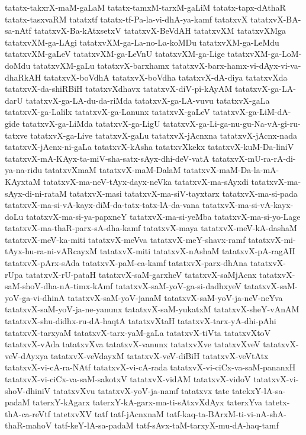 {tatatx-takxrX-maM-gaLaM
tatatx-tamxM-tarxM-gaLiM
tatatx-tapx-dAthaR
tatatx-tasxvaRM
tatatxtf
tatatx-tf-Pa-la-vi-dhA-ya-kamf
tatatxvX
tatatxvX-BA-sa-nAtf
tatatxvX-Ba-kAtxsetxV
tatatxvX-BeVdAH
tatatxvXM
tatatxvXMga
tatatxvXM-ga-LAgi
tatatxvXM-ga-La-no-La-koMDu
tatatxvXM-ga-LeMdu
tatatxvXM-gaLeV
tatatxvXM-ga-LeVnU
tatatxvXM-ga-Lige
tatatxvXM-ga-LoM-doMdu
tatatxvXM-gaLu
tatatxvX-barxhamx
tatatxvX-barx-hamx-vi-dAyx-vi-va-dhaRkAH
tatatxvX-boVdhA
tatatxvX-boVdha
tatatxvX-dA-diya
tatatxvXda
tatatxvX-da-shiRBiH
tatatxvXdhavx
tatatxvX-diV-pi-kAyAM
tatatxvX-ga-LA-darU
tatatxvX-ga-LA-du-da-riMda
tatatxvX-ga-LA-vuvu
tatatxvX-gaLa
tatatxvX-ga-Lalilx
tatatxvX-ga-Lanunx
tatatxvX-gaLeV
tatatxvX-ga-LiM-dA-gide
tatatxvX-ga-LiMda
tatatxvX-ga-LigU
tatatxvX-ga-Li-ga-nu-gu-Na-vA-gi-ru-tatxve
tatatxvX-ga-Live
tatatxvX-gaLu
tatatxvX-jAcnxna
tatatxvX-jAcnx-nada
tatatxvX-jAcnx-ni-gaLa
tatatxvX-kAsha
tatatxvXkekx
tatatxvX-kuM-Da-liniV
tatatxvX-mA-KAyx-ta-miV-sha-satx-sAyx-dhi-deV-vatA
tatatxvX-mU-ra-rA-di-ya-na-ridu
tatatxvXmaM
tatatxvX-maM-DalaM
tatatxvX-maM-Da-la-mA-KAyxtaM
tatatxvX-ma-neV-tAyx-dayx-neVka
tatatxvX-ma-sAyxdi
tatatxvX-ma-sAyx-di-ni-rataM
tatatxvX-masi
tatatxvX-ma-siV-tayxtarx
tatatxvX-ma-si-pada
tatatxvX-ma-si-vA-kayx-diM-da-tatx-tatx-lA-da-vana
tatatxvX-ma-si-vA-kayx-doLu
tatatxvX-ma-si-ya-papxneY
tatatxvX-ma-si-yeMba
tatatxvX-ma-si-yo-Lage
tatatxvX-ma-thaR-parx-sA-dha-kamf
tatatxvX-maya
tatatxvX-meV-kA-dashaM
tatatxvX-meV-ka-miti
tatatxvX-meVva
tatatxvX-meY-shavx-ramf
tatatxvX-mi-tAyx-hu-ra-ni-vARcayxM
tatatxvX-miti
tatatxvX-nAshaM
tatatxvX-pA-ragAH
tatatxvX-pArx-sAda
tatatxvX-paM-ca-kamf
tatatxvX-parx-dhAna
tatatxvX-rUpa
tatatxvX-rU-pataH
tatatxvX-saM-garxheV
tatatxvX-saMjAcnx
tatatxvX-saM-shoV-dha-nA-timx-kAmf
tatatxvX-saM-yoV-ga-si-dadhxyeV
tatatxvX-saM-yoV-ga-vi-dhinA
tatatxvX-saM-yoV-janaM
tatatxvX-saM-yoV-ja-neV-neYva
tatatxvX-saM-yoV-ja-ne-yanunx
tatatxvX-saM-yukatxM
tatatxvX-sheY-vAnAM
tatatxvX-shu-didhx-ru-dA-haqtA
tatatxvXtaH
tatatxvX-tarx-yA-dhi-pAhi
tatatxvX-tarxyaM
tatatxvX-tarx-yaM-gaLa
tatatxvX-tiVta
tatatxvXtoV
tatatxvX-vAda
tatatxvXva
tatatxvX-vanunx
tatatxvXve
tatatxvXveV
tatatxvX-veV-dAyxya
tatatxvX-veVdayxM
tatatxvX-veV-diBiH
tatatxvX-veVtAtx
tatatxvX-vi-cA-ra-NAtf
tatatxvX-vi-cA-rada
tatatxvX-vi-ciCx-va-saM-pananxH
tatatxvX-vi-ciCx-va-saM-sakotxV
tatatxvX-vidAM
tatatxvX-vidoV
tatatxvX-vi-shoV-dhiniV
tatatxvXvu
tatatxvX-yoV-ja-namf
tatatxvx
tate
tatekxY-lA-sa-padaM
taterxY-kAgarx
taterxY-kA-garx-ma-ti-sAtxvXdAyx
taterxYva
tatetx-thA-ca-reVtf
tatetxvXV
tatf
tatf-jAcnxnaM
tatf-kaq-ta-BArxM-ti-vi-nA-shA-thaR-mahoV
tatf-keY-lA-sa-padaM
tatf-sAvx-taM-tarxyX-mu-dA-haq-tamf
}
